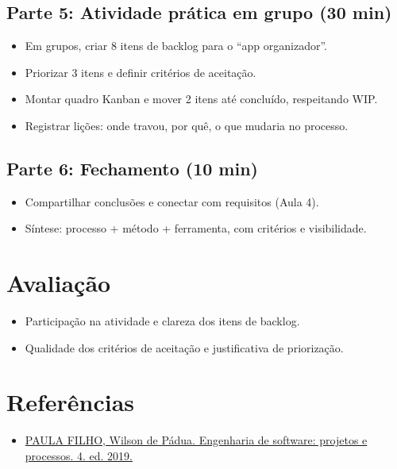 \documentclass[12pt,a4paper]{article}
\begin{document}
\subsection*{Parte 5: Atividade prática em grupo (30 min)}
\begin{itemize}[leftmargin=*,itemsep=0.35em]
  \item Em grupos, criar 8 itens de backlog para o ``app organizador''.
  \item Priorizar 3 itens e definir critérios de aceitação.
  \item Montar quadro Kanban e mover 2 itens até concluído, respeitando WIP.
  \item Registrar lições: onde travou, por quê, o que mudaria no processo.
\end{itemize}

\subsection*{Parte 6: Fechamento (10 min)}
\begin{itemize}[leftmargin=*,itemsep=0.35em]
  \item Compartilhar conclusões e conectar com requisitos (Aula 4).
  \item Síntese: processo + método + ferramenta, com critérios e visibilidade.
\end{itemize}

\section{Avaliação}
\begin{itemize}[leftmargin=*,itemsep=0.25em]
  \item Participação na atividade e clareza dos itens de backlog.
  \item Qualidade dos critérios de aceitação e justificativa de priorização.
\end{itemize}

\section{Referências}
\begin{itemize}[leftmargin=*,itemsep=0.25em]
  \item \href{../99-Materiais/Engenharia%20de%20software%20projetos%20e%20processos%20by%20Wilson%20de%20P%C3%A1dua%20Paula%20Filho%20.epub.pdf}{PAULA FILHO, Wilson de Pádua. Engenharia de software: projetos e processos. 4. ed. 2019.}
\end{itemize}
\end{document}
